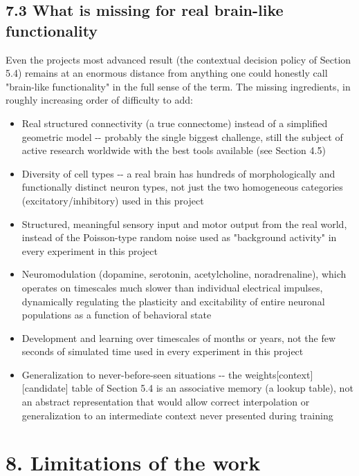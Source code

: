 \documentclass[
  english,
]{article}
\begin{document}
\subsection{7.3 What is missing for real brain-like functionality}\label{what-is-missing-for-real-brain-like-functionality}

Even the project\textquotesingle s most advanced result (the contextual decision policy of Section 5.4) remains at an enormous distance from anything one could honestly call "brain-like functionality" in the full sense of the term. The missing ingredients, in roughly increasing order of difficulty to add:

\begin{itemize}
\item
  Real structured connectivity (a true connectome) instead of a simplified geometric model -\/- probably the single biggest challenge, still the subject of active research worldwide with the best tools available (see Section 4.5)
\item
  Diversity of cell types -\/- a real brain has hundreds of morphologically and functionally distinct neuron types, not just the two homogeneous categories (excitatory/inhibitory) used in this project
\item
  Structured, meaningful sensory input and motor output from the real world, instead of the Poisson-type random noise used as "background activity" in every experiment in this project
\item
  Neuromodulation (dopamine, serotonin, acetylcholine, noradrenaline), which operates on timescales much slower than individual electrical impulses, dynamically regulating the plasticity and excitability of entire neuronal populations as a function of behavioral state
\item
  Development and learning over timescales of months or years, not the few seconds of simulated time used in every experiment in this project
\item
  Generalization to never-before-seen situations -\/- the weights{[}context{]}{[}candidate{]} table of Section 5.4 is an associative memory (a lookup table), not an abstract representation that would allow correct interpolation or generalization to an intermediate context never presented during training
\end{itemize}

\section{8. Limitations of the work}\label{limitations-of-the-work}
\end{document}
